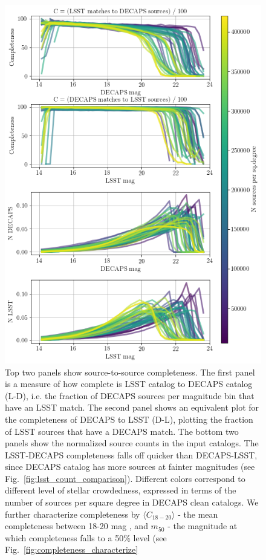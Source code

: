 \documentclass[DM,lsstdraft,toc,usenatbib]{lsstdoc}
\begin{document}
\begin{figure}
\begin{centering}
\includegraphics[width=0.75\columnwidth]{figs/completeness_4_panels_nomarker.png}
\caption{Top two panels show source-to-source completeness.  The first panel is a measure of how complete is LSST catalog to DECAPS catalog (L-D),  i.e. the fraction of DECAPS sources per magnitude bin that have an LSST match.   The second panel shows an equivalent plot for the completeness of DECAPS to LSST (D-L), plotting the fraction of LSST sources that have a DECAPS match.  The bottom two panels show the normalized source counts  in the input catalogs. The LSST-DECAPS completeness falls off quicker than DECAPS-LSST, since DECAPS catalog has more sources at fainter magnitudes (see Fig.~\ref{fig:lsst_count_comparison}). Different colors correspond to different level of stellar crowdedness, expressed in terms of the number of sources per square degree in DECAPS clean catalogs.  We further characterize completeness by $\langle C_{18-20} \rangle$ - the mean completeness between 18-20 mag , and $m_{50}$ - the magnitude at which completeness falls to a 50\% level (see Fig.~\ref{fig:completeness_characterize}}
\label{fig:completeness}
\end{centering}
\end{figure} 
\end{document}
